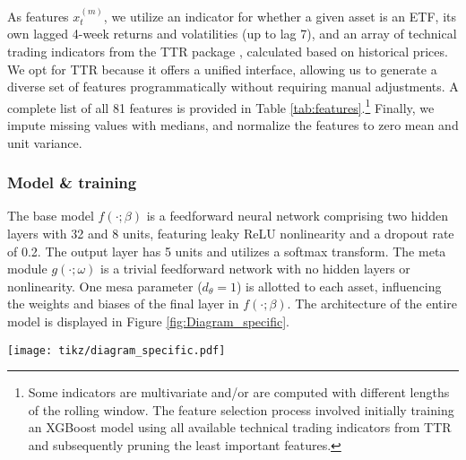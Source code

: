 \documentclass[3p,times,twocolumn]{elsarticle}
\begin{document}
As features $x_{t}^{(m)}$, we utilize an indicator for whether a given asset is an ETF, its own lagged 4-week returns and volatilities (up to lag 7), and an array of technical trading indicators from the TTR package \citep{ulrichTTRTechnicalTrading2021}, calculated based on historical prices.
We opt for TTR because it offers a unified interface, allowing us to generate a diverse set of features programmatically without requiring manual adjustments. 
A complete list of all 81 features is provided in Table \ref{tab:features}.\footnote{
    Some indicators are multivariate and/or are computed with different lengths of the rolling window.
    The feature selection process involved initially training an XGBoost model \citep{chenXgboostExtremeGradient2023} using all available technical trading indicators from TTR and subsequently pruning the least important features.
}
Finally, we impute missing values with medians, and normalize the features to zero mean and unit variance.

\subsubsection{Model \& training}

The base model $f(\cdot;\beta)$ is a feedforward neural network comprising two hidden layers with 32 and 8 units, featuring leaky ReLU nonlinearity and a dropout rate of 0.2. 
The output layer has 5 units and utilizes a softmax transform.
The meta module $g(\cdot;\omega)$ is a trivial feedforward network with no hidden layers or nonlinearity.
One mesa parameter ($d_{\theta}=1$) is allotted to each asset, influencing the weights and biases of the final layer in $f(\cdot; \beta)$.
The architecture of the entire model is displayed in Figure \ref{fig:Diagram_specific}.

\begin{figure*}[!htbp]
    \centering
    \texttt{[image: tikz/diagram\_specific.pdf]}
    \caption{
        A diagram of the MtMs model applied to M6.
        In the case of M6, there are 1000 tasks/assets (100 specified by the organizers and 900 from the additional 9 auxiliary M6-like datasets). 
        Each asset is allotted one univariate mesa parameter $\theta$, which, through the meta module $g(\theta; \omega)$, determines the parameters $\beta$ of the network $f(x;\beta)$. 
        This network then processes the corresponding feature vector $x$ to generate the prediction $\hat{y}$.
        The meta module $g(\theta; \omega)$ is a trivial single-layer neural network that connects $\theta$ to the weights and biases of the last layer of the network $f$; $\beta_{connected}$.
        The remaining nodes corresponding to parameters $\beta_{orphaned}$ are not influenced by $\theta$ and are hence constant across all tasks/assets.
    }
    \label{fig:Diagram_specific}
\end{figure*}
\end{document}
